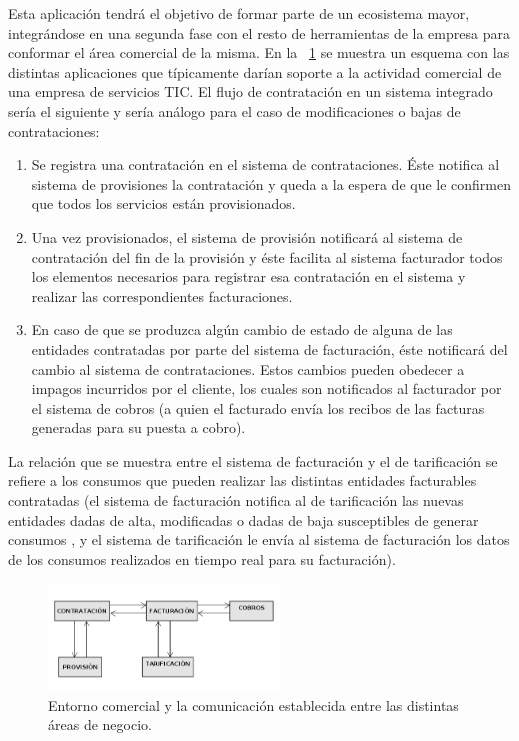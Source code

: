 Esta aplicación tendrá el objetivo de formar parte de un ecosistema mayor, integrándose en una segunda fase con el resto de herramientas de la empresa para conformar el área comercial de la misma. En la \figurename~\ref{fig:area-comercial} se muestra un esquema con las distintas aplicaciones que típicamente darían soporte a la actividad comercial de una empresa de servicios TIC. El flujo de contratación en un sistema integrado sería el siguiente y sería análogo para el caso de modificaciones o bajas de contrataciones:
\begin{enumerate}
\item Se registra una contratación en el sistema de contrataciones. Éste notifica al sistema de provisiones la contratación y queda a la espera de que le confirmen que todos los servicios están provisionados. 
\item Una vez provisionados, el sistema de provisión notificará al sistema de contratación del fin de la provisión y éste facilita al sistema facturador todos los elementos necesarios para registrar esa contratación en el sistema y realizar las correspondientes facturaciones. 
\item En caso de que se produzca algún cambio de estado de alguna de las entidades contratadas por parte del sistema de facturación, éste notificará del cambio al sistema de contrataciones. Estos cambios pueden obedecer a impagos incurridos por el cliente, los cuales son notificados al facturador por el sistema de cobros (a quien el facturado envía los recibos de las facturas generadas para su puesta a cobro).
\end{enumerate}

La relación que se muestra entre el sistema de facturación y el de tarificación se refiere a los consumos que pueden realizar las distintas entidades facturables contratadas (el sistema de facturación notifica al de tarificación las nuevas entidades dadas de alta, modificadas o dadas de baja susceptibles de generar consumos , y el sistema de tarificación le envía al sistema de facturación los datos de los consumos realizados en tiempo real para su facturación).


\begin{figure}
  \centering
  \includegraphics[width=0.55\textwidth]{imaxes/area-comercial.png}
  \caption{Entorno comercial y la comunicación establecida entre las distintas áreas de negocio.}
  \label{fig:area-comercial}
\end{figure}


